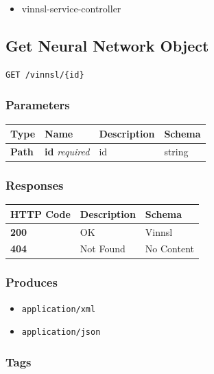 \begin{itemize}
\tightlist
\item
  vinnsl-service-controller
\end{itemize}

\subsection{Get Neural Network Object}\label{get-neural-network-object}

\begin{verbatim}
GET /vinnsl/{id}
\end{verbatim}

\subsubsection{Parameters}\label{parameters-2}

\begin{longtable}[]{@{}llll@{}}
\toprule
Type & Name & Description & Schema\tabularnewline
\midrule
\endhead
\textbf{Path} & \textbf{id} \emph{required} & id & string\tabularnewline
\bottomrule
\end{longtable}

\subsubsection{Responses}\label{responses-3}

\begin{longtable}[]{@{}lll@{}}
\toprule
HTTP Code & Description & Schema\tabularnewline
\midrule
\endhead
\textbf{200} & OK & Vinnsl\tabularnewline
\textbf{404} & Not Found & No Content\tabularnewline
\bottomrule
\end{longtable}

\subsubsection{Produces}\label{produces-3}

\begin{itemize}
\tightlist
\item
  \texttt{application/xml}
\item
  \texttt{application/json}
\end{itemize}

\subsubsection{Tags}\label{tags-3}

